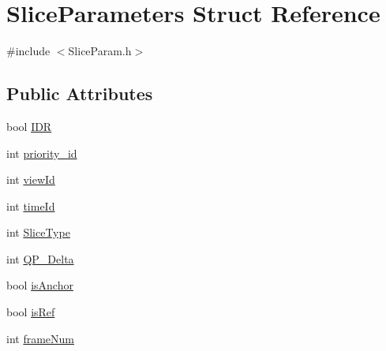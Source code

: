 \hypertarget{struct_slice_parameters}{
\section{SliceParameters Struct Reference}
\label{struct_slice_parameters}
}


{\ttfamily \#include $<$SliceParam.h$>$}

\subsection*{Public Attributes}
\begin{DoxyCompactItemize}
\item 
bool \hyperlink{struct_slice_parameters_a60f8fe21acd611ec6892e47a2c6029e3}{IDR}
\item 
int \hyperlink{struct_slice_parameters_a82aa216a74ffaa7d1859aa1cfe135a8b}{priority\_\-id}
\item 
int \hyperlink{struct_slice_parameters_ae570f1ba10b1e091c7519264534a7143}{viewId}
\item 
int \hyperlink{struct_slice_parameters_ad6a26fe2f228235e4f0c31c336cf5e12}{timeId}
\item 
int \hyperlink{struct_slice_parameters_a8ab83c948c5e095477d918c0664fce0a}{SliceType}
\item 
int \hyperlink{struct_slice_parameters_a5ca0d343251519b63746af21c1cb9f70}{QP\_\-Delta}
\item 
bool \hyperlink{struct_slice_parameters_af8a7ea94e92b177c38277af8b827eb62}{isAnchor}
\item 
bool \hyperlink{struct_slice_parameters_a7e551828136a39ab347f77457aa11dbb}{isRef}
\item 
int \hyperlink{struct_slice_parameters_a20319af06c76e833936a009f3c38d4ef}{frameNum}
\end{DoxyCompactItemize}


